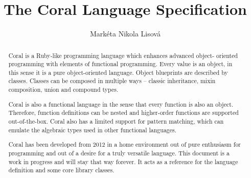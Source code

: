 \documentclass[11pt,a4paper]{report}
\begin{document}
\title{The Coral Language Specification}
\author{Markéta Nikola Lisová}
\maketitle

\begin{abstract}

Coral is a Ruby-like programming language which enhances advanced object- oriented programming with elements of functional programming. Every value is an object, in this sense it is a pure object-oriented language. Object blueprints are described by classes. Classes can be composed in multiple ways – classic inheritance, mixin composition, union and compound types.

Coral is also a functional language in the sense that every function is also an object. Therefore, function definitions can be nested and higher-order functions are supported out-of-the-box. Coral also has a limited support for pattern matching, which can emulate the algebraic types used in other functional languages.

Coral has been developed from 2012 in a home environment out of pure enthusiasm for programming and out of a desire for a truly versatile language. This document is a work in progress and will stay that way forever. It acts as a reference for the language definition and some core library classes.
\end{abstract}
\end{document}
